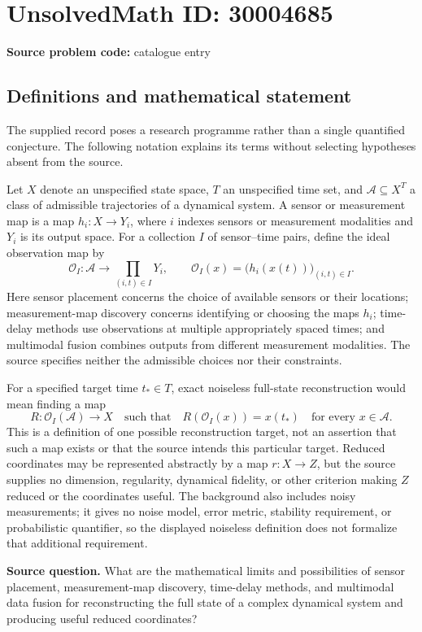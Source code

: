 \documentclass[11pt]{article}
\begin{document}
\section*{UnsolvedMath ID: 30004685}
\textbf{Source problem code:} catalogue entry
\subsection{Definitions and mathematical statement}
The supplied record poses a research programme rather than a single quantified conjecture. The following notation explains its terms without selecting hypotheses absent from the source.

Let \(X\) denote an unspecified state space, \(T\) an unspecified time set, and \(\mathcal{A}\subseteq X^T\) a class of admissible trajectories of a dynamical system. A sensor or measurement map is a map \(h_i:X\to Y_i\), where \(i\) indexes sensors or measurement modalities and \(Y_i\) is its output space. For a collection \(I\) of sensor--time pairs, define the ideal observation map by
\[
\mathcal{O}_I:\mathcal{A}\longrightarrow\prod_{(i,t)\in I}Y_i,
\qquad
\mathcal{O}_I(x)=\bigl(h_i(x(t))\bigr)_{(i,t)\in I}.
\]
Here sensor placement concerns the choice of available sensors or their locations; measurement-map discovery concerns identifying or choosing the maps \(h_i\); time-delay methods use observations at multiple appropriately spaced times; and multimodal fusion combines outputs from different measurement modalities. The source specifies neither the admissible choices nor their constraints.

For a specified target time \(t_*\in T\), exact noiseless full-state reconstruction would mean finding a map
\[
R:\mathcal{O}_I(\mathcal{A})\to X
\quad\text{such that}\quad
R(\mathcal{O}_I(x))=x(t_*)
\quad\text{for every }x\in\mathcal{A}.
\]
This is a definition of one possible reconstruction target, not an assertion that such a map exists or that the source intends this particular target. Reduced coordinates may be represented abstractly by a map \(r:X\to Z\), but the source supplies no dimension, regularity, dynamical fidelity, or other criterion making \(Z\) reduced or the coordinates useful. The background also includes noisy measurements; it gives no noise model, error metric, stability requirement, or probabilistic quantifier, so the displayed noiseless definition does not formalize that additional requirement.

\textbf{Source question.} What are the mathematical limits and possibilities of sensor placement, measurement-map discovery, time-delay methods, and multimodal data fusion for reconstructing the full state of a complex dynamical system and producing useful reduced coordinates?
\end{document}
